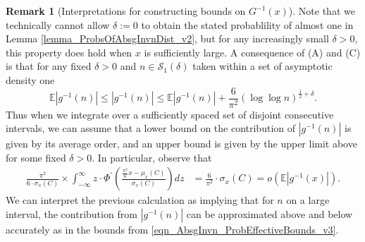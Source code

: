 \documentclass[11pt,reqno,a4letter]{article}
\numberwithin{figure}{section}
\numberwithin{table}{section}
\theoremstyle{plain}
\numberwithin{theorem}{section}
\theoremstyle{definition}
\newtheorem{remark}[theorem]{Remark}
\begin{document}
\begin{remark}[Interpretations for constructing bounds on $G^{-1}(x)$] 
Note that we technically cannot allow $\delta := 0$ to obtain the stated probablility of almost one 
in Lemma \ref{lemma_ProbsOfAbsgInvnDist_v2}, 
but for any increasingly small $\delta > 0$, this property does hold when $x$ is sufficiently large. 
A consequence of (A) and (C) is that for any fixed $\delta > 0$ and $n \in \mathcal{S}_1(\delta)$ 
taken within a set of asymptotic density one 
\begin{equation} 
\label{eqn_AbsgInvn_ProbEffectiveBounds_v3} 
\mathbb{E}|g^{-1}(n)| \leq |g^{-1}(n)| \leq \mathbb{E}|g^{-1}(n)| + \frac{6}{\pi^2} 
     (\log\log n)^{\frac{1}{2} + \delta}. 
\end{equation} 
Thus when we integrate over a sufficiently spaced set of disjoint consecutive intervals, 
we can assume that a lower bound on the contribution of $|g^{-1}(n)|$ is given by its average 
order, and an upper bound is given by the upper limit above for some fixed $\delta > 0$. 
In particular, observe that 
\begin{align*} 
\frac{\pi^2}{6 \cdot \sigma_x(C)} \times \int_{-\infty}^{\infty} z \cdot 
     \Phi^{\prime}\left(\frac{\frac{\pi^2}{6} x - \mu_x(C)}{\sigma_x(C)}\right) dz & = 
     \frac{6}{\pi^2} \cdot \sigma_x(C) = o\left(\mathbb{E}|g^{-1}(x)|\right). 
\end{align*} 
We can interpret the previous calculation as implying that for $n$ on a large 
interval, the contribution from $|g^{-1}(n)|$ can be approximated above and below 
accurately as in the bounds from \eqref{eqn_AbsgInvn_ProbEffectiveBounds_v3}. 
\end{remark} 
\end{document}

